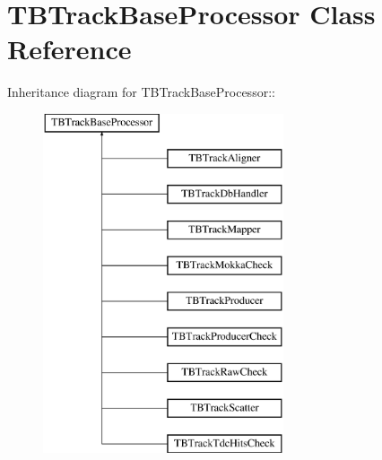 \section{TBTrackBaseProcessor Class Reference}
\label{classTBTrackBaseProcessor}
Inheritance diagram for TBTrackBaseProcessor::\begin{figure}[H]
\begin{center}
\leavevmode
\includegraphics[height=10cm]{classTBTrackBaseProcessor}
\end{center}
\end{figure}
